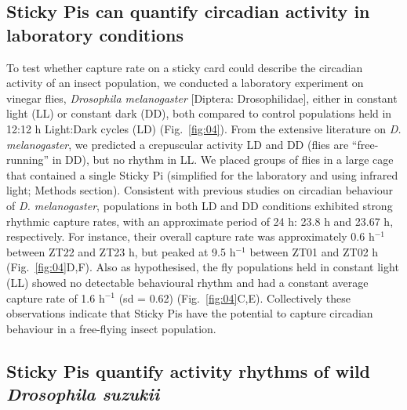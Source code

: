 \documentclass[12pt]{article}
\begin{document}
\begin{linenumbers}
		\subsection*{Sticky Pis can quantify circadian activity in laboratory conditions}
		To test whether capture rate on a sticky card could describe the circadian activity of an insect population, we conducted a laboratory experiment on vinegar flies, \emph{Drosophila melanogaster} [Diptera: Drosophilidae], either in constant light (LL) or constant dark (DD), both compared to control populations held in 12:12 h Light:Dark cycles (LD) (Fig.~\ref{fig:04}). From the extensive literature on \emph{D. melanogaster}, we predicted a crepuscular activity LD and DD (flies are “free-running” in DD), but no rhythm in LL\cite{tataroglu_studying_2014}. We placed groups of flies in a large cage that contained a single Sticky Pi (simplified for the laboratory and using infrared light; Methods section). Consistent with previous studies on circadian behaviour of \emph{D. melanogaster}, populations in both LD and DD conditions exhibited strong rhythmic capture rates, with an approximate period of 24 h: 23.8 h and 23.67 h, respectively. For instance, their overall capture rate was approximately 0.6 h$^{-1}$ between ZT22 and ZT23 h, but peaked at 9.5 h$^{-1}$ between ZT01 and ZT02 h (Fig.~\ref{fig:04}D,F). Also as hypothesised, the fly populations held in constant light (LL) showed no detectable behavioural rhythm and had a constant average capture rate of 1.6 h$^{-1}$ (sd = 0.62) (Fig.~\ref{fig:04}C,E). Collectively these observations indicate that Sticky Pis have the potential to capture circadian behaviour in a free-flying insect population.

		\subsection*{Sticky Pis quantify activity rhythms of wild \emph{Drosophila suzukii}}


\end{linenumbers}
\end{document}
